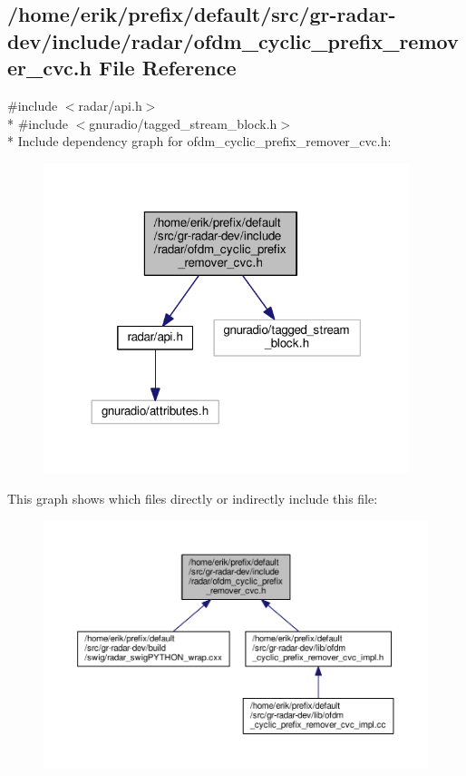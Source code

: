 \subsection{/home/erik/prefix/default/src/gr-\/radar-\/dev/include/radar/ofdm\+\_\+cyclic\+\_\+prefix\+\_\+remover\+\_\+cvc.h File Reference}
\label{ofdm__cyclic__prefix__remover__cvc_8h}
{\ttfamily \#include $<$radar/api.\+h$>$}\\*
{\ttfamily \#include $<$gnuradio/tagged\+\_\+stream\+\_\+block.\+h$>$}\\*
Include dependency graph for ofdm\+\_\+cyclic\+\_\+prefix\+\_\+remover\+\_\+cvc.\+h\+:
\nopagebreak
\begin{figure}[H]
\begin{center}
\leavevmode
\includegraphics[width=302pt]{d0/d04/ofdm__cyclic__prefix__remover__cvc_8h__incl}
\end{center}
\end{figure}
This graph shows which files directly or indirectly include this file\+:
\nopagebreak
\begin{figure}[H]
\begin{center}
\leavevmode
\includegraphics[width=350pt]{d2/d92/ofdm__cyclic__prefix__remover__cvc_8h__dep__incl}
\end{center}
\end{figure}
